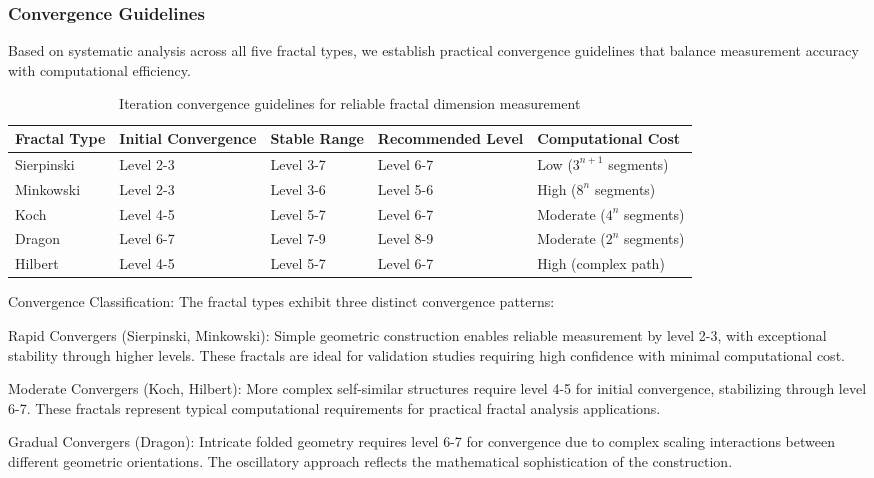 \documentclass[preprint,12pt]{elsarticle}
\def\textbf#1{#1}%
\begin{document}
\subsubsection{Convergence Guidelines}

Based on systematic analysis across all five fractal types, we establish practical convergence guidelines that balance measurement accuracy with computational efficiency.

\begin{table}[H]
\centering
\small
\begin{tabularx}{\textwidth}{@{}lXXXX@{}}
\toprule
\textbf{Fractal Type} & \textbf{Initial Convergence} & \textbf{Stable Range} & \textbf{Recommended Level} & \textbf{Computational Cost} \\
\midrule
Sierpinski & Level 2-3 & Level 3-7 & Level 6-7 & Low ($3^{n+1}$ segments) \\
Minkowski & Level 2-3 & Level 3-6 & Level 5-6 & High ($8^n$ segments) \\
Koch & Level 4-5 & Level 5-7 & Level 6-7 & Moderate ($4^n$ segments) \\
Dragon & Level 6-7 & Level 7-9 & Level 8-9 & Moderate ($2^n$ segments) \\
Hilbert & Level 4-5 & Level 5-7 & Level 6-7 & High (complex path) \\
\bottomrule
\end{tabularx}
\caption{Iteration convergence guidelines for reliable fractal dimension measurement}
\label{tab:convergence_guidelines}
\end{table}

\textbf{Convergence Classification}: The fractal types exhibit three distinct convergence patterns:

\textbf{Rapid Convergers} (Sierpinski, Minkowski): Simple geometric construction enables reliable measurement by level 2-3, with exceptional stability through higher levels. These fractals are ideal for validation studies requiring high confidence with minimal computational cost.

\textbf{Moderate Convergers} (Koch, Hilbert): More complex self-similar structures require level 4-5 for initial convergence, stabilizing through level 6-7. These fractals represent typical computational requirements for practical fractal analysis applications.

\textbf{Gradual Convergers} (Dragon): Intricate folded geometry requires level 6-7 for convergence due to complex scaling interactions between different geometric orientations. The oscillatory approach reflects the mathematical sophistication of the construction.
\end{document}
